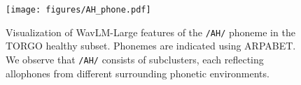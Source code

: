 \begin{figure}[t!]
    \centering
    \texttt{[image: figures/AH\_phone.pdf]}
    \caption{
        Visualization of WavLM-Large features of the \texttt{/AH/} phoneme in the TORGO healthy subset.
        Phonemes are indicated using ARPABET.
        We observe that \texttt{/AH/} consists of subclusters, each reflecting allophones from different surrounding phonetic environments.
    }
    \label{fig:motiv}
\end{figure}


